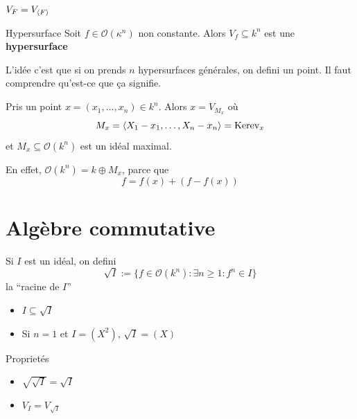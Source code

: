 \begin{proposition}{}
    \(V_F = V_{{\left\langle F\right\rangle} } \) 
\end{proposition}

\begin{definition}{Hypersurface}
    Soit \(f \in \mathcal{O}{(\kappa^{n})}\) non constante. Alors \(V_f
    \subseteq k^{n} \) est une \textbf{hypersurface}
\end{definition}

L'idée c'est que si on prends \(n\) hypersurfaces générales, on defini un point.
Il faut comprendre qu'est-ce que ça signifie.

\begin{definition}{}
    Pris un point \(x = {(x_{1}, \dots, x_{n})} \in k^{n}\). Alors \(x = V_{M_x}
    \) où 
    \[
      M_x = {\left\langle X_{1} - x_{1}, \dots, X_{n} - x_{n}\right\rangle} =
      \mathrm{Ker}\mathrm{ev}_x
    \]
    et \(M_x \subseteq \mathcal{O}{(k^{n})} \) est un idéal maximal.

\end{definition}
\begin{remark}{}
    En effet, \(\mathcal{O}{(k^{n})} = k \oplus M_x\), parce que
    \[
      f = f{(x)} + {(f - f{(x)})}
    \]
\end{remark}

\section{Algèbre commutative}

\begin{definition}{}
    Si \(I\) est un idéal, on defini
    \[
      \sqrt{I} := \{f \in \mathcal{O}{(k^{n})}: \exists n \ge 1 : f^{n} \in I\} 
    \]
    la ``racine de \(I\)''
\end{definition}
\begin{example}{}
\begin{itemize} \(\) 
    \item \( I \subseteq \sqrt{I} \) 
    \item Si \(n = 1\) et \(I = {(X^2)}\), \(\sqrt{I} = {(X)}\) 
\end{itemize}
\end{example}

\begin{eser}{Proprietés}
\begin{itemize}
    \item \(\sqrt{\sqrt{I}} = \sqrt{I}\) 
    \item \(V_I = V_{\sqrt{I}}\) 
\end{itemize}
\end{eser}

